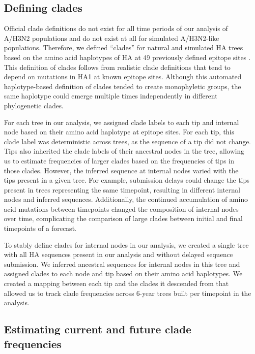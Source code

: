 \documentclass[9pt,lineno]{elife}
\begin{document}
\subsection{Defining clades}

Official clade definitions do not exist for all time periods of our analysis of A/H3N2 populations and do not exist at all for simulated A/H3N2-like populations.
Therefore, we defined ``clades'' for natural and simulated HA trees based on the amino acid haplotypes of HA at 49 previously defined epitope sites \citep{Luksza:2014hj}.
This definition of clades follows from realistic clade definitions that tend to depend on mutations in HA1 at known epitope sites.
Although this automated haplotype-based definition of clades tended to create monophyletic groups, the same haplotype could emerge multiple times independently in different phylogenetic clades.

For each tree in our analysis, we assigned clade labels to each tip and internal node based on their amino acid haplotype at epitope sites.
For each tip, this clade label was deterministic across trees, as the sequence of a tip did not change.
Tips also inherited the clade labels of their ancestral nodes in the tree, allowing us to estimate frequencies of larger clades based on the frequencies of tips in those clades.
However, the inferred sequence at internal nodes varied with the tips present in a given tree.
For example, submission delays could change the tips present in trees representing the same timepoint, resulting in different internal nodes and inferred sequences.
Additionally, the continued accumulation of amino acid mutations between timepoints changed the composition of internal nodes over time, complicating the comparison of large clades between initial and final timepoints of a forecast.

To stably define clades for internal nodes in our analysis, we created a single tree with all HA sequences present in our analysis and without delayed sequence submission.
We inferred ancestral sequences for internal nodes in this tree and assigned clades to each node and tip based on their amino acid haplotypes.
We created a mapping between each tip and the clades it descended from that allowed us to track clade frequencies across 6-year trees built per timepoint in the analysis.

\subsection{Estimating current and future clade frequencies}
\end{document}

